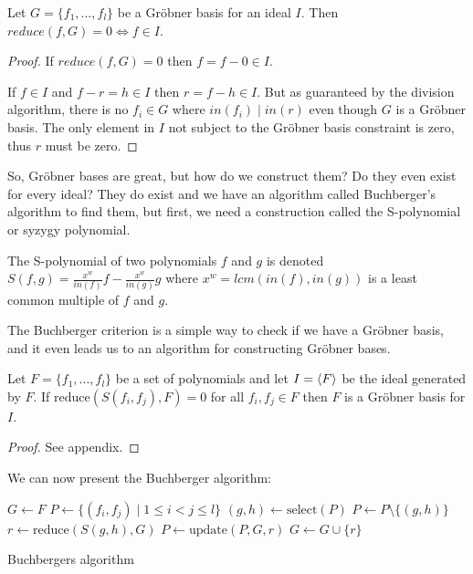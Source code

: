 \documentclass{article}
\theoremstyle{changedot}
\theoremstyle{changedotbreak}
\theoremstyle{nonumberplain}
\newtheorem{proof}{Proof}
\DeclarePairedDelimiter{\tuple}{\langle}{\rangle}
\begin{document}
\begin{theorem}
  Let $G = \{f_{1}, \dots, f_{l}\}$ be a Gröbner basis for an ideal $I$. Then $reduce(f, G) = 0 \Longleftrightarrow f \in I$.
\end{theorem}
\begin{proof}
  If $reduce(f, G) = 0$ then $f = f - 0 \in I$.

  If $f \in I$ and $f - r = h \in I$ then $r = f - h \in I$. But as guaranteed by the division algorithm, there is no $f_{i} \in G$ where $in(f_{i}) \mid in(r)$ even though $G$ is a Gröbner basis. The only element in $I$ not subject to the Gröbner basis constraint is zero, thus $r$ must be zero.
\end{proof}

So, Gröbner bases are great, but how do we construct them? Do they even exist for every ideal? They do exist and we have an algorithm called Buchberger's algorithm to find them, but first, we need a construction called the S-polynomial or syzygy polynomial.

\begin{definition}
  The S-polynomial of two polynomials $f$ and $g$ is denoted $S(f, g) = \frac{x^{w}}{in(f)} f - \frac{x^{w}}{in(g)} g$ where $x^{w} = lcm(in(f), in(g))$ is a least common multiple of $f$ and $g$.
\end{definition}

The Buchberger criterion is a simple way to check if we have a Gröbner basis, and it even leads us to an algorithm for constructing Gröbner bases.

\begin{theorem}\label{thm:buchberger_crit}
Let $F = \{f_{1}, \dots, f_{l}\}$ be a set of polynomials and let $I = \tuple F$ be the ideal generated by $F$. If $\text{reduce}(S(f_{i}, f_{j}), F) = 0$ for all $f_{i}, f_{j} \in F$ then $F$ is a Gröbner basis for $I$.
\end{theorem}
\begin{proof}
  See appendix.
\end{proof}

We can now present the Buchberger algorithm:

\begin{algorithm}[H]
\DontPrintSemicolon

  $G \leftarrow F$ \;
  $P \leftarrow \{(f_{i}, f_{j}) \mid 1 \leq i < j \leq l\}$ \;
  {
    $(g, h) \leftarrow \text{select}(P)$ \;
    $P \leftarrow P \setminus \{(g, h)\}$ \;
    $r \leftarrow \text{reduce}(S(g, h), G)$ \;
    {
      $P \leftarrow \text{update}(P, G, r)$ \;
      $G \leftarrow G \cup \{r\}$ \;
    }
  }

\caption{Buchbergers algorithm}
\end{algorithm}
\end{document}
